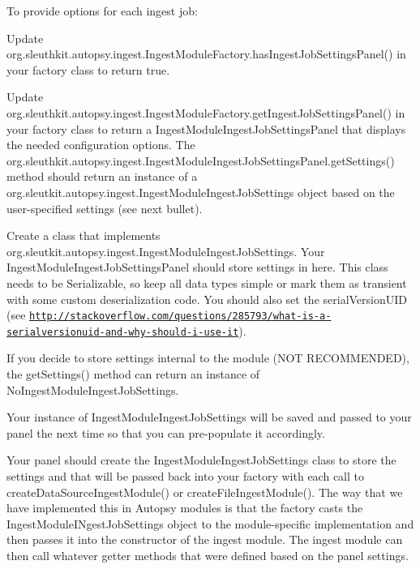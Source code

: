 To provide options for each ingest job\+:
\begin{DoxyItemize}
\item Update org.\+sleuthkit.\+autopsy.\+ingest.\+Ingest\+Module\+Factory.\+has\+Ingest\+Job\+Settings\+Panel() in your factory class to return true.
\item Update org.\+sleuthkit.\+autopsy.\+ingest.\+Ingest\+Module\+Factory.\+get\+Ingest\+Job\+Settings\+Panel() in your factory class to return a Ingest\+Module\+Ingest\+Job\+Settings\+Panel that displays the needed configuration options. The org.\+sleuthkit.\+autopsy.\+ingest.\+Ingest\+Module\+Ingest\+Job\+Settings\+Panel.\+get\+Settings() method should return an instance of a org.\+sleutkit.\+autopsy.\+ingest.\+Ingest\+Module\+Ingest\+Job\+Settings object based on the user-\/specified settings (see next bullet).
\item Create a class that implements org.\+sleutkit.\+autopsy.\+ingest.\+Ingest\+Module\+Ingest\+Job\+Settings. Your Ingest\+Module\+Ingest\+Job\+Settings\+Panel should store settings in here. This class needs to be Serializable, so keep all data types simple or mark them as transient with some custom deserialization code. You should also set the serial\+Version\+U\+ID (see \href{http://stackoverflow.com/questions/285793/what-is-a-serialversionuid-and-why-should-i-use-it}{\tt http\+://stackoverflow.\+com/questions/285793/what-\/is-\/a-\/serialversionuid-\/and-\/why-\/should-\/i-\/use-\/it}).
\item If you decide to store settings internal to the module (N\+OT R\+E\+C\+O\+M\+M\+E\+N\+D\+ED), the get\+Settings() method can return an instance of No\+Ingest\+Module\+Ingest\+Job\+Settings.
\item Your instance of Ingest\+Module\+Ingest\+Job\+Settings will be saved and passed to your panel the next time so that you can pre-\/populate it accordingly.
\end{DoxyItemize}

Your panel should create the Ingest\+Module\+Ingest\+Job\+Settings class to store the settings and that will be passed back into your factory with each call to create\+Data\+Source\+Ingest\+Module() or create\+File\+Ingest\+Module(). The way that we have implemented this in Autopsy modules is that the factory casts the Ingest\+Module\+I\+Ngest\+Job\+Settings object to the module-\/specific implementation and then passes it into the constructor of the ingest module. The ingest module can then call whatever getter methods that were defined based on the panel settings.

